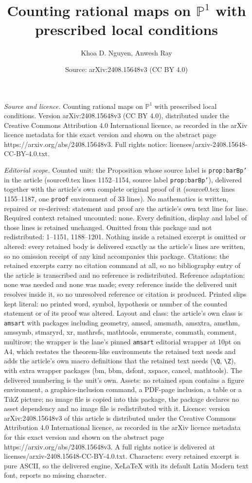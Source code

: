 \documentclass[10pt,a4paper]{amsart}
\title[Counting rational maps on $\mathbb{P}^1$ with prescribed loc]{Counting rational maps on $\mathbb{P}^1$ with prescribed local conditions}
\author{Khoa D. Nguyen, Anwesh Ray}
\date{Source: arXiv:2408.15648v3 (CC BY 4.0)}
\begin{document}
\maketitle

\noindent\emph{Source and licence.} Counting rational maps on $\mathbb{P}^1$ with prescribed local conditions. Version arXiv:2408.15648v3 (CC BY 4.0), distributed under the Creative Commons Attribution 4.0 International licence, as recorded in the arXiv licence metadata for this exact version and shown on the abstract page https://arxiv.org/abs/2408.15648v3. Full rights notice: licenses/arxiv-2408.15648-CC-BY-4.0.txt.\par\smallskip

\noindent\textit{Editorial scope.} Counted unit: the Proposition whose source label is \texttt{prop:barBp'} in the article (source0.tex lines 1152--1154, source label \texttt{prop:barBp'}), delivered together with the article's own complete original proof of it (source0.tex lines 1155--1187, one \texttt{proof} environment of 33 lines). No mathematics is written, repaired or re-derived: statement and proof are the article's own text line for line. Required context retained uncounted: none. Every definition, display and label of those lines is retained unchanged. Omitted from this package and not redistributed: 1--1151, 1188--1201. Nothing inside a retained excerpt is omitted or altered: every retained body is delivered exactly as the article's lines are written, so no omission receipt of any kind accompanies this package. Citations: the retained excerpts carry no citation command at all, so no bibliography entry of the article is transcribed and no reference is redistributed. Reference adaptation: none was needed and none was made; every reference inside the delivered unit resolves inside it, so no unresolved reference or citation is produced. Printed slips kept literal: no printed word, symbol, hypothesis or number of the counted statement or of its proof was altered. Layout and class: the article's own class is \texttt{amsart} with packages including geometry, amscd, amsmath, amsxtra, amsthm, amssymb, stmaryrd, xr, mathrsfs, mathtools, enumerate, commath, comment, multirow; the wrapper is the lane's pinned \texttt{amsart} editorial wrapper at 10pt on A4, which restates the theorem-like environments the retained text needs and adds the article's own macro definitions that the retained text needs (\texttt{\textbackslash Q}, \texttt{\textbackslash Z}), with extra wrapper packages (bm, bbm, dsfont, xspace, cancel, mathtools). The delivered numbering is the unit's own. Assets: no retained span contains a figure environment, a graphics-inclusion command, a PDF-page inclusion, a table or a TikZ picture; no image file is copied into this package, the package declares no asset dependency and no image file is redistributed with it. Licence: version arXiv:2408.15648v3 of this article is distributed under the Creative Commons Attribution 4.0 International licence, as recorded in the arXiv licence metadata for this exact version and shown on the abstract page https://arxiv.org/abs/2408.15648v3. A full rights notice is delivered at licenses/arxiv-2408.15648-CC-BY-4.0.txt. Characters: every retained excerpt is pure ASCII, so the delivered engine, XeLaTeX with its default Latin Modern text font, reports no missing character.
\end{document}
